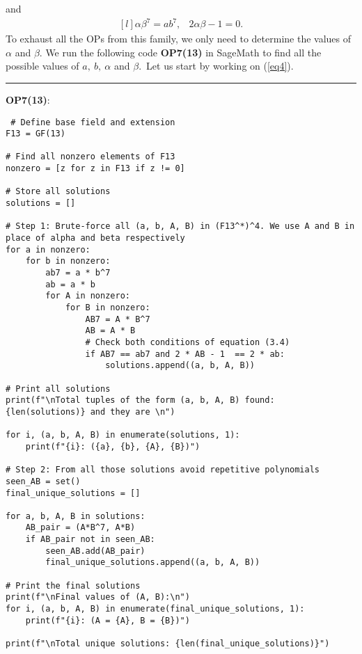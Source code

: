 \documentclass[12pt,a4wide, reqno]{amsart}
\theoremstyle{definition}
\theoremstyle{remark}
\numberwithin{equation}{section}
\begin{document}
and
\begin{equation}\label{eq6}
    \begin{matrix*}[l]
         \alpha \beta ^7=ab^7, & 2\alpha \beta -1=0.
    \end{matrix*}
\end{equation}
 To exhaust all the OPs from this family, we only need to determine the values of $\alpha$ and $\beta.$ We run the following code \textbf{OP7(13)} in SageMath to find all the possible values of $a,~b,~\alpha$ and $\beta.$~Let us start by working on (\ref{eq4}).
 \vspace{0.5 cm}
 \hrule
 \vspace{0.2 cm}
 \textbf{OP7(13)}:
 \vspace{0.2 cm}
 \vspace{0.1 cm}
 \begin{lstlisting}
 # Define base field and extension
F13 = GF(13)

# Find all nonzero elements of F13
nonzero = [z for z in F13 if z != 0]

# Store all solutions
solutions = []

# Step 1: Brute-force all (a, b, A, B) in (F13^*)^4. We use A and B in place of alpha and beta respectively
for a in nonzero:
    for b in nonzero:
        ab7 = a * b^7
        ab = a * b
        for A in nonzero:
            for B in nonzero:
                AB7 = A * B^7
                AB = A * B
                # Check both conditions of equation (3.4)
                if AB7 == ab7 and 2 * AB - 1  == 2 * ab:
                    solutions.append((a, b, A, B))

# Print all solutions
print(f"\nTotal tuples of the form (a, b, A, B) found: {len(solutions)} and they are \n")

for i, (a, b, A, B) in enumerate(solutions, 1):
    print(f"{i}: ({a}, {b}, {A}, {B})")

# Step 2: From all those solutions avoid repetitive polynomials
seen_AB = set()
final_unique_solutions = []

for a, b, A, B in solutions:
    AB_pair = (A*B^7, A*B)
    if AB_pair not in seen_AB:
        seen_AB.add(AB_pair)
        final_unique_solutions.append((a, b, A, B))

# Print the final solutions
print(f"\nFinal values of (A, B):\n")
for i, (a, b, A, B) in enumerate(final_unique_solutions, 1):
    print(f"{i}: (A = {A}, B = {B})")

print(f"\nTotal unique solutions: {len(final_unique_solutions)}")
\end{lstlisting}
\end{document}
